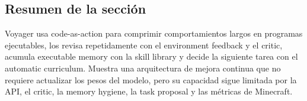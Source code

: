 \subsection{Resumen de la sección}

Voyager usa code-as-action para comprimir comportamientos largos en programas ejecutables, los revisa repetidamente con el environment feedback y el critic, acumula executable memory con la skill library y decide la siguiente tarea con el automatic curriculum. Muestra una arquitectura de mejora continua que no requiere actualizar los pesos del modelo, pero su capacidad sigue limitada por la API, el critic, la memory hygiene, la task proposal y las métricas de Minecraft.
